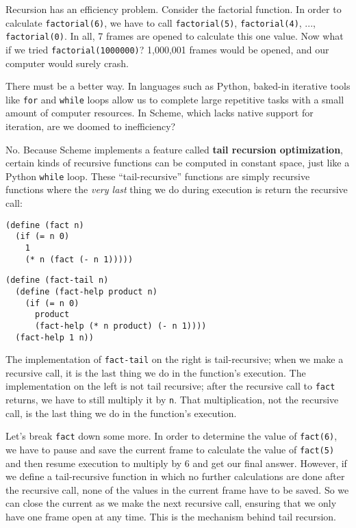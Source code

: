 Recursion has an efficiency problem. Consider the factorial function. In order to calculate \lstinline{factorial(6)}, we have to call \lstinline{factorial(5)}, \lstinline{factorial(4)}, ..., \lstinline{factorial(0)}. In all, 7 frames are opened to calculate this one value. Now what if we tried \texttt{factorial(1000000)}? 1,000,001 frames would be opened, and our computer would surely crash. 

There must be a better way. In languages such as Python, baked-in iterative tools like \lstinline{for} and \lstinline{while} loops allow us to complete large repetitive tasks with a small amount of computer resources. In Scheme, which lacks native support for iteration, are we doomed to inefficiency?

No. Because Scheme implements a feature called \textbf{tail recursion optimization}, certain kinds of recursive functions can be computed in constant space, just like a Python \lstinline{while} loop. These ``tail-recursive'' functions are simply recursive functions where the \textit{very last} thing we do during execution is return the recursive call: 

\begin{minipage}[t]{0.5\textwidth}
  \begin{lstlisting}
(define (fact n)
  (if (= n 0) 
    1
    (* n (fact (- n 1)))))
  \end{lstlisting}
  \end{minipage}
  \begin{minipage}[t]{0.5\textwidth}
  \begin{lstlisting}
(define (fact-tail n)
  (define (fact-help product n)
    (if (= n 0)
      product
      (fact-help (* n product) (- n 1))))
  (fact-help 1 n))
  \end{lstlisting}
  \end{minipage}

The implementation of \lstinline{fact-tail} on the right is tail-recursive; when we make a recursive call, it is the last thing we do in the function's execution. The implementation on the left is not tail recursive; after the recursive call to \lstinline{fact} returns, we have to still multiply it by \lstinline{n}. That multiplication, not the recursive call, is the last thing we do in the function's execution. 

Let's break \lstinline{fact} down some more. In order to determine the value of \lstinline{fact(6)}, we have to pause and save the current frame to calculate the value of \lstinline{fact(5)} and then resume execution to multiply by 6 and get our final answer. However, if we define a tail-recursive function in which no further calculations are done after the recursive call, none of the values in the current frame have to be saved. So we can close the current as we make the next recursive call, ensuring that we only have one frame open at any time. This is the mechanism behind tail recursion. 

